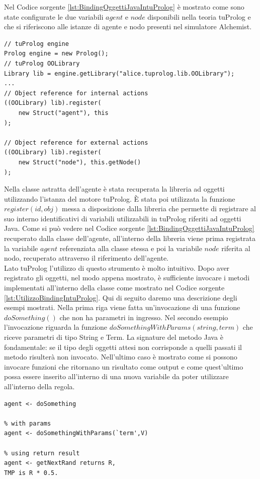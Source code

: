 Nel Codice sorgente \ref{lst:BindingOggettiJavaIntuProlog} è mostrato come sono state configurate le due variabili $agent$ e $node$ disponibili nella teoria tuProlog e che si riferiscono alle istanze di agente e nodo presenti nel simulatore Alchemist.
\begin{lstlisting}[firstnumber=1,label={lst:BindingOggettiJavaIntuProlog},caption={Binding oggetti Java in tuProlog}]
// tuProlog engine
Prolog engine = new Prolog();
// tuProlog OOLibrary
Library lib = engine.getLibrary("alice.tuprolog.lib.OOLibrary");
...
// Object reference for internal actions
((OOLibrary) lib).register(
	new Struct("agent"), this
);

// Object reference for external actions
((OOLibrary) lib).register(
	new Struct("node"), this.getNode()
);
\end{lstlisting}
Nella classe astratta dell'agente è stata recuperata la libreria ad oggetti utilizzando l'istanza del motore tuProlog.
\`E stata poi utilizzata la funzione $register(id, obj)$ messa a disposizione dalla libreria che permette di registrare al suo interno identificativi di variabili utilizzabili in tuProlog riferiti ad oggetti Java.
Come si può vedere nel Codice sorgente \ref{lst:BindingOggettiJavaIntuProlog} recuperato dalla classe dell'agente, all'interno della libreria viene prima registrata la variabile $agent$ referenziata alla classe stessa e poi la variabile $node$ riferita al nodo, recuperato attraverso il riferimento dell'agente.
\\
Lato tuProlog l'utilizzo di questo strumento è molto intuitivo. Dopo aver registrato gli oggetti, nel modo appena mostrato, è sufficiente invocare i metodi implementati all'interno della classe come mostrato nel Codice sorgente \ref{lst:UtilizzoBindingIntuProlog}. Qui di seguito daremo una descrizione degli esempi mostrati.
Nella prima riga viene fatta un'invocazione di una funzione $doSomething()$ che non ha parametri in ingresso.
Nel secondo esempio l'invocazione riguarda la funzione $doSomethingWithParams(string, term)$ che riceve parametri di tipo String e Term. La signature del metodo Java è fondamentale: se il tipo degli oggetti attesi non corrisponde a quelli passati il metodo risulterà non invocato.
Nell'ultimo caso è mostrato come si possono invocare funzioni che ritornano un risultato come output e come quest'ultimo possa essere inserito all'interno di una nuova variabile da poter utilizzare all'interno della regola.

\medskip
\begin{lstlisting}[firstnumber=1,label={lst:UtilizzoBindingIntuProlog},caption={Utilizzo riferimenti oggetti Java in tuProlog}]
% no params
agent <- doSomething

% with params
agent <- doSomethingWithParams(`term',V)

% using return result
agent <- getNextRand returns R,
TMP is R * 0.5.
\end{lstlisting}

